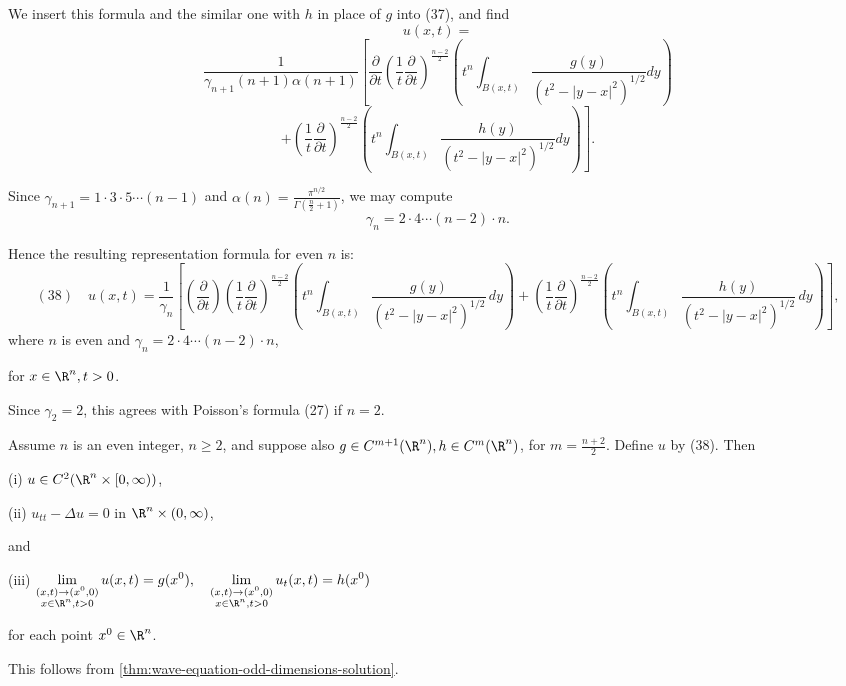 We insert this formula and the similar one with $h$ in place of $g$ into (37), and find
$$u(x,t) =$$
$$\frac{1}{\gamma_{n+1}(n+1)\alpha(n+1)} \left[ \frac{\partial}{\partial t} \left(\frac{1}{t}\frac{\partial}{\partial t}\right)^{\frac{n-2}{2}} \left( t^n \int_{B(x,t)} \frac{g(y)}{(t^2-|y-x|^2)^{1/2}} dy \right) \right.$$
$$\left. + \left(\frac{1}{t}\frac{\partial}{\partial t}\right)^{\frac{n-2}{2}} \left( t^n \int_{B(x,t)} \frac{h(y)}{(t^2-|y-x|^2)^{1/2}} dy \right) \right].$$

Since $\gamma_{n+1} = 1 \cdot 3 \cdot 5 \cdots (n-1)$ and $\alpha(n) = \frac{\pi^{n/2}}{\Gamma(\frac{n}{2}+1)}$, we may compute
$$\gamma_n = 2 \cdot 4 \cdots (n-2) \cdot n.$$

Hence the resulting representation formula for even $n$ is:
$$(38) \quad u(x,t) = \frac{1}{\gamma_n}\left[\left(\frac{\partial}{\partial t}\right)\left(\frac{1}{t}\frac{\partial}{\partial t}\right)^{\frac{n-2}{2}}\left(t^n\int_{B(x,t)}\frac{g(y)}{(t^2-|y-x|^2)^{1/2}}\,dy\right) + \left(\frac{1}{t}\frac{\partial}{\partial t}\right)^{\frac{n-2}{2}}\left(t^n\int_{B(x,t)}\frac{h(y)}{(t^2-|y-x|^2)^{1/2}}\,dy\right)\right],$$
where $n$ is even and $\gamma_n = 2 \cdot 4 \cdots (n-2) \cdot n$,

for $x \in \R^n, t > 0$.

Since $\gamma_2 = 2$, this agrees with Poisson's formula (27) if $n = 2$.

\begin{theorem}
\label{thm:wave-equation-even-dimensions-solution}
Assume $n$ is an even integer, $n \geq 2$, and suppose also $g \in C^{m+1}(\R^n), h \in C^m(\R^n)$, for $m = \frac{n+2}{2}$. Define $u$ by (38). Then

(i) $u \in C^2(\R^n \times [0,\infty))$,

(ii) $u_{tt} - \Delta u = 0$ in $\R^n \times (0,\infty)$,

and

(iii) $\displaystyle\lim_{\substack{(x,t) \to (x^0,0) \\ x \in \R^n, t > 0}} u(x,t) = g(x^0), \quad \lim_{\substack{(x,t) \to (x^0,0) \\ x \in \R^n, t > 0}} u_t(x,t) = h(x^0)$

for each point $x^0 \in \R^n$.
\end{theorem}

This follows from \cref{thm:wave-equation-odd-dimensions-solution}.

